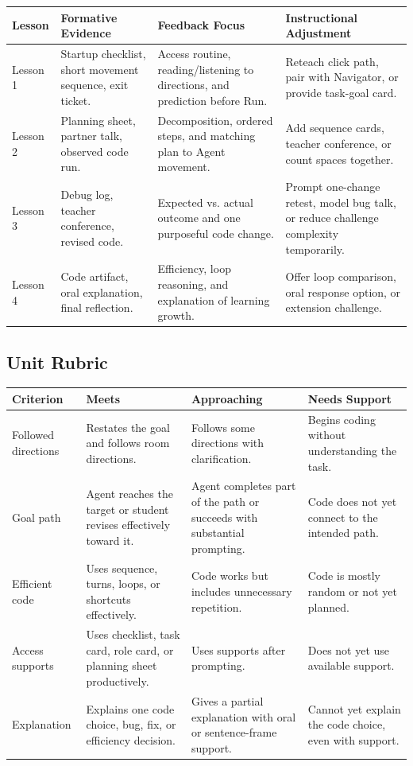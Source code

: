 \documentclass[12pt]{article}
\begin{document}
\begin{xltabular}{\textwidth}{|P{0.7in}|P{1.7in}|P{2.0in}|L|}
\hline
{}\color{white}\bfseries Lesson & \color{white}\bfseries Formative Evidence & \color{white}\bfseries Feedback Focus & \color{white}\bfseries Instructional Adjustment \\
\hline
Lesson 1 & Startup checklist, short movement sequence, exit ticket. & Access routine, reading/listening to directions, and prediction before Run. & Reteach click path, pair with Navigator, or provide task-goal card. \\
\hline
{} Lesson 2 & Planning sheet, partner talk, observed code run. & Decomposition, ordered steps, and matching plan to Agent movement. & Add sequence cards, teacher conference, or count spaces together. \\
\hline
Lesson 3 & Debug log, teacher conference, revised code. & Expected vs. actual outcome and one purposeful code change. & Prompt one-change retest, model bug talk, or reduce challenge complexity temporarily. \\
\hline
{} Lesson 4 & Code artifact, oral explanation, final reflection. & Efficiency, loop reasoning, and explanation of learning growth. & Offer loop comparison, oral response option, or extension challenge. \\
\hline
\end{xltabular}

\subsection{Unit Rubric}

\begin{xltabular}{\textwidth}{|P{0.8in}|P{1.8in}|P{1.8in}|L|}
\hline
{}\color{white}\bfseries Criterion & \color{white}\bfseries Meets & \color{white}\bfseries Approaching & \color{white}\bfseries Needs Support \\
\hline
Followed directions & Restates the goal and follows room directions. & Follows some directions with clarification. & Begins coding without understanding the task. \\
\hline
{} Goal path & Agent reaches the target or student revises effectively toward it. & Agent completes part of the path or succeeds with substantial prompting. & Code does not yet connect to the intended path. \\
\hline
Efficient code & Uses sequence, turns, loops, or shortcuts effectively. & Code works but includes unnecessary repetition. & Code is mostly random or not yet planned. \\
\hline
{} Access supports & Uses checklist, task card, role card, or planning sheet productively. & Uses supports after prompting. & Does not yet use available support. \\
\hline
Explanation & Explains one code choice, bug, fix, or efficiency decision. & Gives a partial explanation with oral or sentence-frame support. & Cannot yet explain the code choice, even with support. \\
\hline
\end{xltabular}
\end{document}
